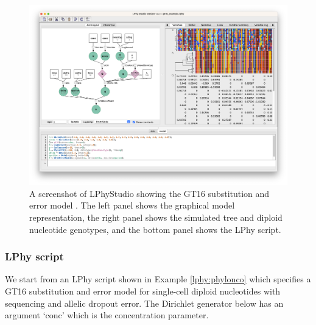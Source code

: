 \documentclass[10pt,letterpaper,table]{article}
\theoremstyle{definition}
\begin{document}

\begin{figure}[!ht]
    \centering
    \includegraphics[width=\textwidth]{figs_plos/phylonco.png }
    \caption{A screenshot of LPhyStudio showing the GT16 substitution and error model \cite{kozlov2022cellphy, chen2022accounting}. 
    The left panel shows the graphical model representation, the right panel shows the simulated tree and diploid nucleotide genotypes, and the bottom panel shows the LPhy script. }
\end{figure}

\subsubsection*{LPhy script}
We start from an LPhy script shown in Example \ref{lphy:phylonco} which specifies a GT16 substitution and error model \cite{kozlov2022cellphy} for single-cell diploid nucleotides with sequencing and allelic dropout error.
The Dirichlet generator below has an argument `conc' which is the concentration parameter. 
\end{document}
